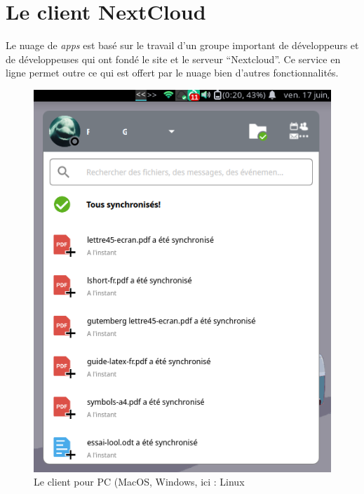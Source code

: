\section{Le client NextCloud}
Le nuage de \emph{apps} est basé sur le travail d'un groupe important de développeurs et de développeuses qui ont fondé le site et le serveur ``Nextcloud''. 
Ce service en ligne permet outre ce qui est offert par le nuage bien d'autres fonctionnalités. 

\begin{multicols}{2}

\begin{figure}
	\centering
	\includegraphics{./Captures/nextcloud-client.fenetre.principale.png}
	\caption{Le client pour PC (MacOS, Windows, ici : Linux}
\end{figure}

\columnbreak


\end{multicols}
